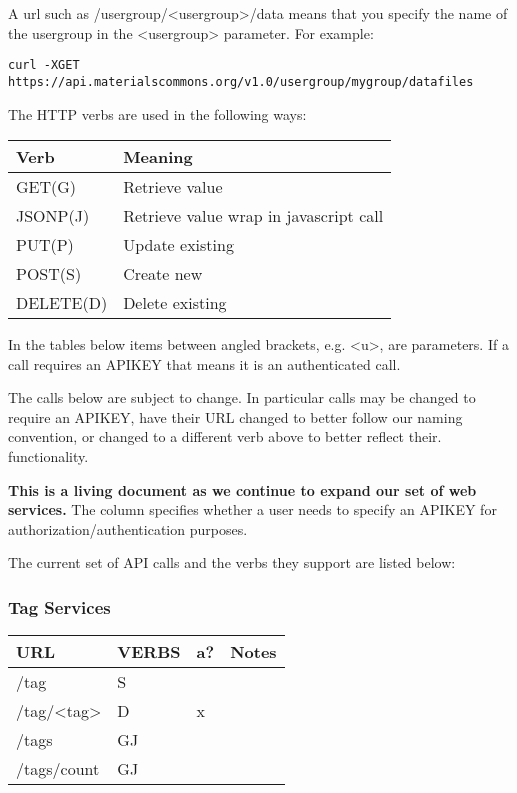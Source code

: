 \documentclass[11pt]{article}
\begin{document}
A url such as /usergroup/<usergroup>/data means that you specify the name of the
usergroup in the <usergroup> parameter. For example:

\begin{verbatim}
curl -XGET https://api.materialscommons.org/v1.0/usergroup/mygroup/datafiles
\end{verbatim}

The HTTP verbs are used in the following ways:

\begin{center}
\begin{tabular}{ll}
Verb & Meaning\\
\hline
GET(G) & Retrieve value\\
JSONP(J) & Retrieve value wrap in javascript call\\
PUT(P) & Update existing\\
POST(S) & Create new\\
DELETE(D) & Delete existing\\
\end{tabular}
\end{center}

In the tables below items between angled brackets, e.g. <u>, are parameters.
If a call requires an APIKEY that means it is an authenticated call.

The calls below are subject to change. In particular calls may be changed to
require an APIKEY, have their URL changed to better follow our naming
convention, or changed to a different verb above to better reflect their.
functionality.

\textbf{This is a living document as we continue to expand our set of web services.}
The column specifies whether a user needs to specify an APIKEY for
authorization/authentication purposes.

The current set of API calls and the verbs they support are listed below:

\subsubsection{Tag Services}
\label{sec-1-1-1}

\begin{center}
\begin{tabular}{llll}
URL & VERBS & a? & Notes\\
\hline
/tag & S &  & \\
/tag/<tag> & D & x & \\
/tags & GJ &  & \\
/tags/count & GJ &  & \\
\end{tabular}
\end{center}
\end{document}

